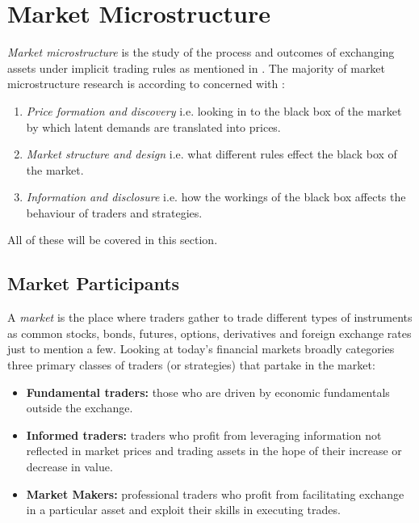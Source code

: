 \documentclass{kththesis}
\theoremstyle{definition}
\begin{document}


\section{Market Microstructure}
\textit{Market microstructure} is the study of the process and outcomes of exchanging assets under implicit trading rules as mentioned in \textcite{o1995market}. The majority of market microstructure research is according to \textcite{madhavan2000market} concerned with : 
\begin{enumerate}
    \item \textit{Price formation and discovery} i.e. looking in to the black box of the market by which latent demands are translated into prices.
    \item \textit{Market structure and design} i.e. what different rules effect the black box of the market.
    \item \textit{Information and disclosure} i.e. how the workings of the black box affects the behaviour of traders and strategies.
\end{enumerate}
All of these will be covered in this section.


\subsection{Market Participants}
A \textit{market} is the place where traders gather to trade \parencite{harris2003trading} different types of instruments as common stocks, bonds, futures, options, derivatives and foreign exchange rates just to mention a few.
Looking at today's financial markets
\textcite{cartea2015algorithmic} broadly categories three primary classes of traders (or strategies) that partake in the market:
\begin{itemize}
    \item \textbf{Fundamental traders:} those who are driven by economic fundamentals outside the exchange.
    \item \textbf{Informed traders:} traders who profit from leveraging information not reflected in market prices and trading assets in the hope of their increase or decrease in value.
    \item \textbf{Market Makers:} professional traders who profit from facilitating exchange in a particular asset and exploit their skills in executing trades.
\end{itemize}
\end{document}
